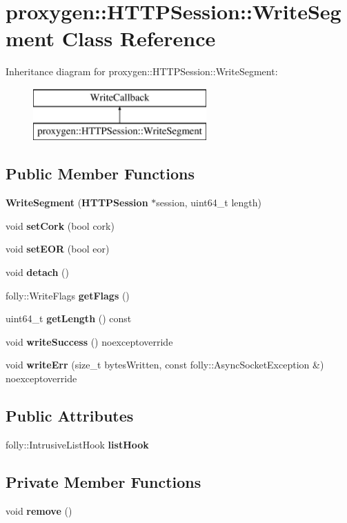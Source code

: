 \section{proxygen\+:\+:H\+T\+T\+P\+Session\+:\+:Write\+Segment Class Reference}
\label{classproxygen_1_1HTTPSession_1_1WriteSegment}
Inheritance diagram for proxygen\+:\+:H\+T\+T\+P\+Session\+:\+:Write\+Segment\+:\begin{figure}[H]
\begin{center}
\leavevmode
\includegraphics[height=2.000000cm]{classproxygen_1_1HTTPSession_1_1WriteSegment}
\end{center}
\end{figure}
\subsection*{Public Member Functions}
\begin{DoxyCompactItemize}
\item 
{\bf Write\+Segment} ({\bf H\+T\+T\+P\+Session} $\ast$session, uint64\+\_\+t length)
\item 
void {\bf set\+Cork} (bool cork)
\item 
void {\bf set\+E\+OR} (bool eor)
\item 
void {\bf detach} ()
\item 
folly\+::\+Write\+Flags {\bf get\+Flags} ()
\item 
uint64\+\_\+t {\bf get\+Length} () const 
\item 
void {\bf write\+Success} () noexceptoverride
\item 
void {\bf write\+Err} (size\+\_\+t bytes\+Written, const folly\+::\+Async\+Socket\+Exception \&) noexceptoverride
\end{DoxyCompactItemize}
\subsection*{Public Attributes}
\begin{DoxyCompactItemize}
\item 
folly\+::\+Intrusive\+List\+Hook {\bf list\+Hook}
\end{DoxyCompactItemize}
\subsection*{Private Member Functions}
\begin{DoxyCompactItemize}
\item 
void {\bf remove} ()
\end{DoxyCompactItemize}
